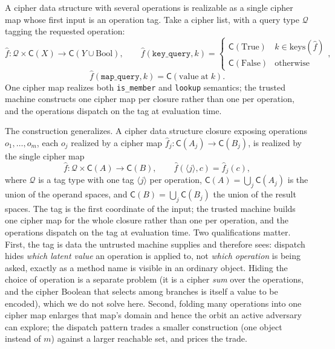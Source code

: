 \documentclass[11pt]{article}
\theoremstyle{definition}
\theoremstyle{plain}
\theoremstyle{definition}
\theoremstyle{remark}
\newcommand{\fhat}{\hat{f}}
\newcommand{\cipher}[1]{\mathsf{C}(#1)}
\begin{document}
A cipher data structure with several operations is realizable as a
single cipher map whose first input is an operation tag. Take a cipher
list, with a query type $\mathcal{Q}$ tagging the requested operation:
\[
\fhat : \mathcal{Q} \times \cipher{X} \to \cipher{Y \cup \mathrm{Bool}},
\qquad
\fhat(\texttt{key\_query}, k) = \begin{cases}
\cipher{\mathrm{True}} & k \in \mathrm{keys}(\fhat)\\
\cipher{\mathrm{False}} & \text{otherwise}
\end{cases},
\]
\[
\fhat(\texttt{map\_query}, k) = \cipher{\mathrm{value}\;\mathrm{at}\;k}.
\]
One cipher map realizes both \texttt{is\_member} and \texttt{lookup}
semantics; the trusted machine constructs one cipher map per closure
rather than one per operation, and the operations dispatch on the tag
at evaluation time.

The construction generalizes. A cipher data structure closure exposing
operations $o_1, \ldots, o_m$, each $o_j$ realized by a cipher map
$\fhat_j : \cipher{A_j} \to \cipher{B_j}$, is realized by the single
cipher map
\[
\fhat : \mathcal{Q} \times \cipher{A} \to \cipher{B},
\qquad
\fhat(\langle j \rangle, c) = \fhat_j(c),
\]
where $\mathcal{Q}$ is a tag type with one tag $\langle j \rangle$ per
operation, $\cipher{A} = \bigcup_j \cipher{A_j}$ is the union of the
operand spaces, and $\cipher{B} = \bigcup_j \cipher{B_j}$ the union of
the result spaces. The tag is the first coordinate of the input; the
trusted machine builds one cipher map for the whole closure rather
than one per operation, and the operations dispatch on the tag at
evaluation time. Two qualifications matter. First, the tag is data the
untrusted machine supplies and therefore sees: dispatch hides
\emph{which latent value} an operation is applied to, not \emph{which
operation} is being asked, exactly as a method name is visible in an
ordinary object. Hiding the choice of operation is a separate problem
(it is a cipher \emph{sum} over the operations, and the cipher Boolean
that selects among branches is itself a value to be encoded), which we
do not solve here. Second, folding many operations into one cipher map
enlarges that map's domain and hence the orbit an active adversary can
explore; the dispatch pattern trades a smaller construction (one
object instead of $m$) against a larger reachable set, and
 prices the trade.
\end{document}
